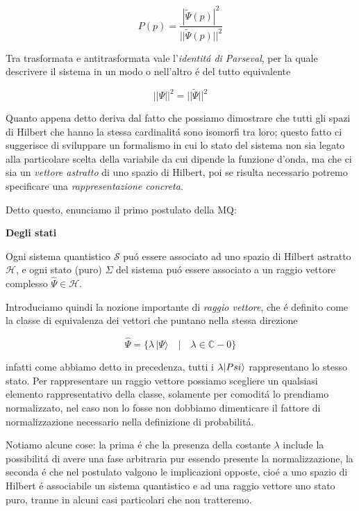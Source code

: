 $$P(p)=\frac{|\tilde{\Psi}(p)|^{2}}{||\tilde{\Psi}(p)||^{2}}$$

Tra trasformata e antitrasformata vale l'\textit{identit\'a di Parseval}, per la quale descrivere il sistema in un modo o nell'altro \'e del tutto equivalente 

$$||\Psi||^2 = ||\tilde{\Psi}||^2$$

Quanto appena detto deriva dal fatto che possiamo dimostrare che tutti gli spazi di Hilbert che hanno la stessa cardinalit\'a sono isomorfi tra loro; questo fatto ci suggerisce di sviluppare un formalismo in cui lo stato del sistema non sia legato alla particolare scelta della variabile da cui dipende la funzione d'onda, ma che ci sia un \textit{vettore astratto} di uno spazio di Hilbert, poi se risulta necessario potremo specificare una \textit{rappresentazione concreta}.

Detto questo, enunciamo il primo postulato della MQ:

\begin{postulato}  \textbf{Degli stati}

Ogni sistema quantistico $\mathcal{S}$ pu\'o essere associato ad uno spazio di Hilbert astratto $\mathcal{H}$, e ogni stato (puro) $\Sigma$ del sistema pu\'o essere associato a un raggio vettore complesso $\hat{\Psi} \in \mathcal{H}$.
\end{postulato}

Introduciamo quindi la nozione importante di \textit{raggio vettore}, che \'e definito come la classe di equivalenza dei vettori che puntano nella stessa direzione

$${\hat{\Psi}}=\{\lambda\,|\Psi\rangle\quad\big|\quad\lambda\in\mathbb{C}-0\}$$

infatti come abbiamo detto in precedenza, tutti i $\lambda \ket{Psi}$ rappresentano lo stesso stato. Per rappresentare un raggio vettore possiamo scegliere un qualsiasi elemento rappresentativo della classe, solamente per comodit\'a lo prendiamo normalizzato, nel caso non lo fosse non dobbiamo dimenticare il fattore di normalizzazione necessario nella definizione di probabilit\'a.

Notiamo alcune cose: la prima \'e che la presenza della costante $\lambda$ include la possibilit\'a di avere una fase arbitraria pur essendo presente la normalizzazione, la seconda \'e che nel postulato valgono le implicazioni opposte, cio\'e a uno spazio di Hilbert \'e associabile un sistema quantistico e ad una raggio vettore uno stato puro, tranne in alcuni casi particolari che non tratteremo.



